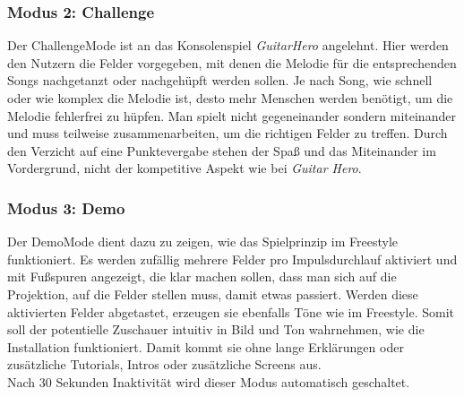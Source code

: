 \subsubsection{Modus 2: Challenge}
Der ChallengeMode ist an das Konsolenspiel \textit{GuitarHero} angelehnt. Hier werden den Nutzern die Felder vorgegeben, mit denen die Melodie für die entsprechenden Songs nachgetanzt oder nachgehüpft werden sollen. Je nach Song, wie schnell oder wie komplex die Melodie ist, desto mehr Menschen werden benötigt, um die Melodie fehlerfrei zu hüpfen. Man spielt nicht gegeneinander sondern miteinander und muss teilweise zusammenarbeiten, um die richtigen Felder zu treffen. Durch den Verzicht auf eine Punktevergabe stehen der Spaß und das Miteinander im Vordergrund, nicht der kompetitive Aspekt wie bei \textit{Guitar Hero}.

\subsubsection{Modus 3: Demo}
Der DemoMode dient dazu zu zeigen, wie das Spielprinzip im Freestyle funktioniert. Es werden zufällig mehrere Felder pro Impulsdurchlauf aktiviert und mit Fußspuren angezeigt, die klar machen sollen, dass man sich auf die Projektion, auf die Felder stellen muss, damit etwas passiert. Werden diese aktivierten Felder abgetastet, erzeugen sie ebenfalls Töne wie im Freestyle. Somit soll der potentielle Zuschauer intuitiv in Bild und Ton wahrnehmen, wie die Installation funktioniert. Damit kommt sie ohne lange Erklärungen oder zusätzliche Tutorials, Intros oder zusätzliche Screens aus.\\
Nach 30 Sekunden Inaktivität wird dieser Modus automatisch geschaltet.






